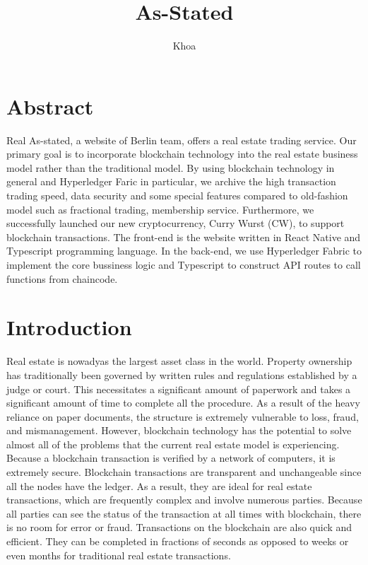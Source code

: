 \documentclass[11pt]{article}
\title{\LARGE As-Stated}
\author{Khoa}
\begin{document}
    \maketitle
    \begin{multicols}{2}
        \section{Abstract} 
            Real As-stated, a website of Berlin team, offers a real estate trading service.
            Our primary goal is to incorporate blockchain technology into the real estate business model rather than the traditional model.
            By using blockchain technology in general and Hyperledger Faric in particular, we archive the high transaction trading speed, data security and some special features compared to old-fashion model such as fractional trading, membership service.
            Furthermore, we successfully launched our new cryptocurrency, Curry Wurst (CW), to support blockchain transactions.
            The front-end is the website written in React Native and Typescript programming language.
            In the back-end, we use Hyperledger Fabric to implement the core bussiness logic and Typescript to construct API routes to call functions from chaincode.
        \section{Introduction}
            Real estate is nowadyas the largest asset class in the world. 
            Property ownership has traditionally been governed by written rules and regulations established by a judge or court.
            This necessitates a significant amount of paperwork and takes a significant amount of time to complete all the procedure.
            As a result of the heavy reliance on paper documents, the structure is extremely vulnerable to loss, fraud, and mismanagement.
            However, blockchain technology has the potential to solve almost all of the problems that the current real estate model is experiencing. \\
            Because a blockchain transaction is verified by a network of computers, it is extremely secure. 
            Blockchain transactions are transparent and unchangeable since all the nodes have the ledger. 
            As a result, they are ideal for real estate transactions, which are frequently complex and involve numerous parties. 
            Because all parties can see the status of the transaction at all times with blockchain, there is no room for error or fraud. 
            Transactions on the blockchain are also quick and efficient. 
            They can be completed in fractions of seconds as opposed to weeks or even months for traditional real estate transactions.

\end{multicols}
\end{document}

